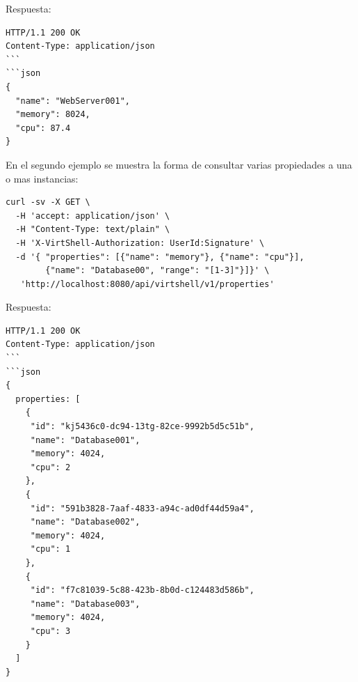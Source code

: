 \vspace{5mm}

Respuesta:

\begin{lstlisting}[style=json, caption=Respuesta]
HTTP/1.1 200 OK
Content-Type: application/json
```
```json
{
  "name": "WebServer001",
  "memory": 8024,
  "cpu": 87.4
}
\end{lstlisting}


\vspace{5mm}

En el segundo ejemplo se muestra la forma de consultar varias propiedades a una o mas instancias:

\vspace{5mm}

\begin{lstlisting}[style=json, caption=Ejemplo consultando propiedades a varias instancias]
curl -sv -X GET \
  -H 'accept: application/json' \
  -H "Content-Type: text/plain" \
  -H 'X-VirtShell-Authorization: UserId:Signature' \
  -d '{ "properties": [{"name": "memory"}, {"name": "cpu"}],
        {"name": "Database00", "range": "[1-3]"}]}' \
   'http://localhost:8080/api/virtshell/v1/properties'
\end{lstlisting}

\vspace{5mm}

Respuesta:

\begin{lstlisting}[style=json, caption=Respuesta]
HTTP/1.1 200 OK
Content-Type: application/json
```
```json
{
  properties: [
    {
     "id": "kj5436c0-dc94-13tg-82ce-9992b5d5c51b",
     "name": "Database001",
     "memory": 4024,
     "cpu": 2
    },
    {
     "id": "591b3828-7aaf-4833-a94c-ad0df44d59a4",
     "name": "Database002",
     "memory": 4024,
     "cpu": 1  
    },
    {
     "id": "f7c81039-5c88-423b-8b0d-c124483d586b",
     "name": "Database003",
     "memory": 4024,
     "cpu": 3  
    }
  ]  
}
\end{lstlisting}